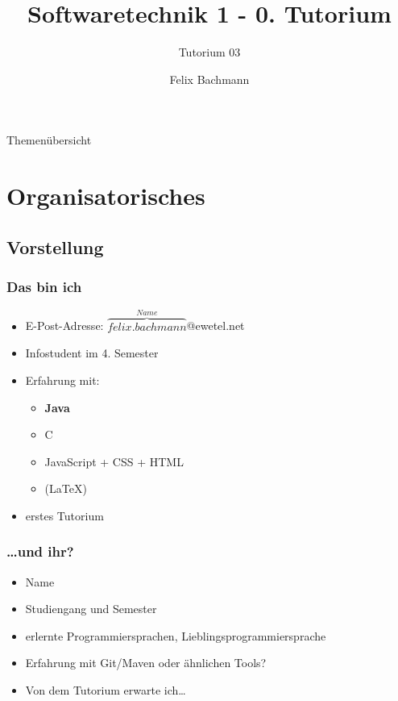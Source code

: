 \documentclass[18pt]{beamer}
\title[SWT1]{Softwaretechnik 1 - 0. Tutorium}
\subtitle{Tutorium 03}
\author{Felix Bachmann}
\institute{KIT - Institut für Programmstrukturen und Datenorganisation (IPD)}
\begin{document}

\begin{frame}
\titlepage
\end{frame}

\begin{frame}{Themenübersicht}
\tableofcontents
\end{frame}

\section{Organisatorisches}
	\subsection{Vorstellung}
		\begin{frame}
			\frametitle{Das bin ich}
			\begin{itemize}
				\item E-Post-Adresse: $\overbrace{felix.bachmann}^{Name}$@ewetel.net 
				\item Infostudent im 4. Semester
				\item Erfahrung mit:
				\begin{itemize}
					\item \textbf{Java}
					\item C
					\item JavaScript + CSS + HTML
					\item (\LaTeX)
				\end{itemize}
				\item erstes Tutorium
			\end{itemize}
		\end{frame}
		\begin{frame}
			\frametitle{\dots und ihr?}
			\begin{itemize}
				\item Name
				\item Studiengang und Semester
				\item erlernte Programmiersprachen, Lieblingsprogrammiersprache
				\item Erfahrung mit Git/Maven oder ähnlichen Tools?
				\item Von dem Tutorium erwarte ich\dots
			\end{itemize}
		\end{frame}
		
\end{document}
